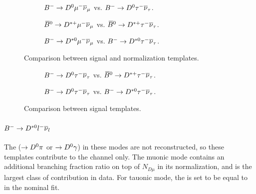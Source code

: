 \begin{figure}[!htb]
    \begin{subfigure}{\textwidth}
        \caption{
            ${{{B}^-}} \rightarrow {\ensuremath{{D}^0}}{\ensuremath{\mu^-}}{\ensuremath{{\overline{\nu}}_\mu}}$ vs.
            ${{{B}^-}} \rightarrow {\ensuremath{{D}^0}}{\ensuremath{\tau^-}}{\ensuremath{{\overline{\nu}}_\tau}}$.
        }
        \label{fig:d0-sig-vs-d0-norm}
    \end{subfigure}

    \begin{subfigure}{\textwidth}
        \caption{
            ${{\kern 0.18em\overline{\kern -0.18em B}}{}^0} \rightarrow {\ensuremath{{D}^{*+}}}{\ensuremath{\mu^-}}{\ensuremath{{\overline{\nu}}_\mu}}$ vs.
            ${{\kern 0.18em\overline{\kern -0.18em B}}{}^0} \rightarrow {\ensuremath{{D}^{*+}}}{\ensuremath{\tau^-}}{\ensuremath{{\overline{\nu}}_\tau}}$.
        }
        \label{fig:dst-sig-vs-dst-norm}
    \end{subfigure}

    \begin{subfigure}{\textwidth}
        \caption{
            ${{{B}^-}} \rightarrow {\ensuremath{{D}^{*0}}}{\ensuremath{\mu^-}}{\ensuremath{{\overline{\nu}}_\mu}}$ vs.
            ${{{B}^-}} \rightarrow {\ensuremath{{D}^{*0}}}{\ensuremath{\tau^-}}{\ensuremath{{\overline{\nu}}_\tau}}$.
        }
        \label{fig:dst0-sig-vs-dst0-norm}
    \end{subfigure}
    \caption{Comparison between signal and normalization templates.}
\end{figure}

\begin{figure}[!htb]
    \begin{subfigure}{\textwidth}
        \caption{
            ${{{B}^-}} \rightarrow {\ensuremath{{D}^0}}{\ensuremath{\tau^-}}{\ensuremath{{\overline{\nu}}_\tau}}$ vs.
            ${{\kern 0.18em\overline{\kern -0.18em B}}{}^0} \rightarrow {\ensuremath{{D}^{*+}}}{\ensuremath{\tau^-}}{\ensuremath{{\overline{\nu}}_\tau}}$.
        }
        \label{fig:d0-sig-vs-dst-sig}
    \end{subfigure}

    \begin{subfigure}{\textwidth}
        \caption{
            ${{{B}^-}} \rightarrow {\ensuremath{{D}^0}}{\ensuremath{\tau^-}}{\ensuremath{{\overline{\nu}}_\tau}}$ vs.
            ${{{B}^-}} \rightarrow {\ensuremath{{D}^{*0}}}{\ensuremath{\tau^-}}{\ensuremath{{\overline{\nu}}_\tau}}$.
        }
        \label{fig:d0-sig-vs-dst0-sig}
    \end{subfigure}

    \caption{Comparison between signal templates.}
\end{figure}

\paragraph{${{{B}^-}} \rightarrow D^{*0}{l^-}{{\overline{\nu}}_l}$}
The \Dstarz ($\rightarrow {\ensuremath{{D}^0}} \pi$ or $\rightarrow {\ensuremath{{D}^0}} \gamma$)
in these modes are not reconstructed,
so these templates contribute to the \Dz channel only.
The muonic mode contains an additional branching fraction ratio on top of
$N_{D\mu}$ in its normalization, and is the largest class of contribution
in \Dz data.
For tauonic mode, the \RDstz is set to be equal to \RDstp in the nominal fit.



